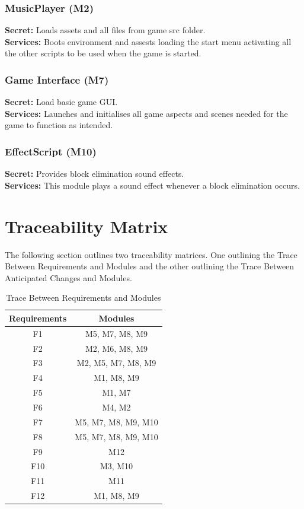 \documentclass[12pt, titlepage]{article}
\begin{document}
{\color{blue}
\subsubsection{MusicPlayer (M2)}
\noindent \textbf{Secret:} Loads assets and all files from game src folder.\\
\textbf{Services:} Boots environment and assests loading the start menu activating all the other scripts to be used when the game is started.

\subsubsection{Game Interface (M7)}
\noindent \textbf{Secret:} Load basic game GUI.\\
\textbf{Services:} Launches and initialises all game aspects and scenes needed for the game to function as intended.

\subsubsection{EffectScript (M10)}
\noindent \textbf{Secret:} Provides block elimination sound effects.\\
\textbf{Services:} This module plays a sound effect whenever a block elimination occurs.

}


\section{Traceability Matrix}
\noindent The following section outlines two traceability matrices. One outlining the Trace Between Requirements and Modules and the other outlining the Trace Between Anticipated Changes and Modules.

\begin{center}
\begin{table}[H]
\centering
\begin{tabular}{ |c| c| }\hline

 \textbf{Requirements}         & \textbf{Modules}  \\ \hline
 F1   & M5, M7, M8, M9  \\ \hline
 F2   & M2, M6, M8, M9  \\ \hline
 F3   & M2, M5, M7, M8, M9  \\ \hline
 F4   & M1, M8, M9  \\ \hline
 F5   & M1, M7  \\ \hline
 F6   & M4, M2  \\ \hline
 F7   & M5, M7, M8, M9, M10  \\ \hline
 F8   & M5, M7, M8, M9, M10  \\ \hline
 F9   & M12  \\ \hline
 F10  & M3, M10  \\ \hline
 F11  & M11  \\ \hline
 F12  & M1, M8, M9  \\ \hline
\end{tabular}
\caption{Trace Between Requirements and Modules}
\end{table}
\end{center}
\end{document}
